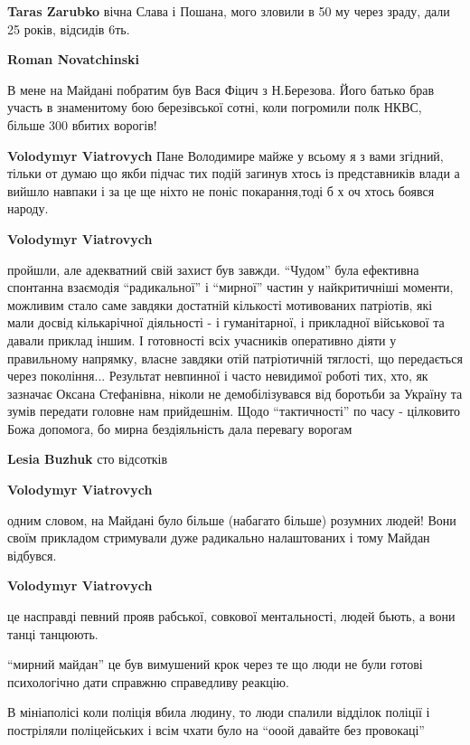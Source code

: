 \begin{itemize}
\begin{itemize}
\begin{itemize}
\textbf{Taras Zarubko} вічна Слава і Пошана, мого зловили в 50 му через зраду, дали 25 років, відсидів 6ть.

\textbf{Roman Novatchinski} 

В мене на Майдані побратим був Вася Фіцич з Н.Березова. Його батько брав участь
в знаменитому бою березівської сотні, коли погромили полк НКВС, більше 300
вбитих ворогів!

\end{itemize} %

\textbf{Volodymyr Viatrovych} Пане Володимире майже у всьому я з вами згідний, тільки от думаю що якби підчас тих подій загинув хтось із представників влади а вийшло навпаки і за це ще ніхто не поніс покарання,тоді б х оч хтось боявся народу.

\textbf{Volodymyr Viatrovych} 

пройшли, але адекватний свій захист був завжди. \enquote{Чудом} була ефективна
спонтанна взаємодія \enquote{радикальної} і \enquote{мирної} частин у найкритичніші моменти,
можливим стало саме завдяки достатній кількості мотивованих патріотів, які мали
досвід кількарічної діяльності - і гуманітарної, і прикладної військової та
давали приклад іншим. І готовності всіх учасників оперативно діяти у
правильному напрямку, власне завдяки отій патріотичній тяглості, що передається
через покоління... Результат невпинної і часто невидимої роботі тих, хто, як
зазначає Оксана Стефанівна, ніколи не демобілізувався від боротьби за Україну
та зумів передати головне нам прийдешнім. Щодо \enquote{тактичності} по часу -
цілковито Божа допомога, бо мирна бездіяльність дала перевагу ворогам

\textbf{Lesia Buzhuk} сто відсотків

\textbf{Volodymyr Viatrovych} 

одним словом, на Майдані було більше (набагато більше) розумних людей! Вони
своїм прикладом стримували дуже радикально налаштованих і тому Майдан відбувся.

\textbf{Volodymyr Viatrovych} 

це насправді певний прояв рабської, совкової ментальності, людей бьють, а вони танці танцюють.

\enquote{мирний майдан} це був вимушений крок через те що люди не були готові
психологічно дати справжню справедливу реакцію.

В мініаполісі коли поліція вбила людину, то люди спалили відділок поліції і
постріляли поліцейських і всім чхати було на \enquote{ооой давайте без провокаці}


\end{itemize}
\end{itemize}

